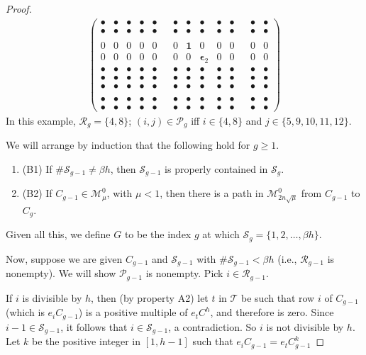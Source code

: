 \documentclass{amsart}
\theoremstyle{definition}
\theoremstyle{remark}
\newcommand{\bu}{\bullet}
\numberwithin{equation}{section}
\begin{document}
{{\begin{proof}
\begin{align*}
\begin{pmatrix}
\bu &\bu &\bu &\bu &\bu   && \bu &\bu &\bu &\bu &\bu && \bu &\bu  \\ 
\bu &\bu &\bu &\bu &\bu && \bu &\bu &\bu &\bu &\bu && \bu &\bu  \\ 
 & & & & & & & & & & &  & & \\
0&0&0&0&0&  & 0&\mathbf 1 &0&0&0            & &0&0 \\
0&0&0&0&0&  & 0&0&\boldsymbol\epsilon_2   &0&0& &0&0 \\ 
\bu &\bu &\bu &\bu &\bu &  & \bu &\bu &\bu &\bu   &\bu & &\bu &\bu  \\ 
\bu &\bu &\bu &\bu &\bu &  & \bu &\bu &\bu &\bu &\bu   & &\bu &\bu  \\ 
\bu &\bu &\bu &\bu &\bu &  & \bu &\bu &\bu &\bu &\bu                      & &\bu &\bu  \\ 
 & & & & & & & & & & &  & & \\
\bu &\bu &\bu &\bu &\bu && \bu &\bu &\bu &\bu &\bu && \bu &\bu  \\ 
\bu &\bu &\bu &\bu &\bu && \bu &\bu &\bu &\bu &\bu && \bu &\bu  
\end{pmatrix} 
\end{align*} 
In this example, 
$\mathcal R_{g}=\{4,8\}$; 
$(i,j)\in \mathcal P_{g}$ iff 
$i\in \{4,8\}$ and 
$j\in \{5,9,10,11,12\}$.

We will arrange by induction that the 
following hold for $g\geq 1$.  
\begin{enumerate} 
\item[] (B1) 
If $\# \mathcal S_{g-1}\neq \beta h$, then $\mathcal S_{g-1}$
is properly contained in  $\mathcal S_{g}$. 
\item[] (B2)  
If  $C_{g-1}\in \mathcal M^0_{\mu}$, 
with $\mu <1$, 
then there is a path 
 in $\mathcal M^0_{2n\sqrt{ \mu}}$
from $C_{g-1}$ to 
$C_{g}$.  
\end{enumerate} 
Given all this, we  define 
 $G$ to be the index $g$ at which $\mathcal S_g=
\{1,2,\dots , \beta h\}$.  

Now, suppose we are given $C_{g-1}$
 and $\mathcal S_{g-1}$ with 
$\#\mathcal S_{g-1} < \beta h$ 
(i.e.,  $\mathcal R_{g-1}$ is nonempty). 
We will show  $\mathcal P_{g-1}$ is 
nonempty. 
Pick $i\in \mathcal R_{g-1}$. 

If $i$ is divisible by $h$, then 
(by property A2) let $t$ in 
$\mathcal T$ be such that row $i$ of $C_{g-1}$ 
(which is $e_iC_{g-1}$) is a positive 
multiple of $e_tC^h$, and therefore is zero. 
Since $i-1\in \mathcal S_{g-1}$, it follows 
that $i\in \mathcal S_{g-1}$, a contradiction. 
So $i$ is not divisible by $h$. Let $k$ be 
the positive integer  in $[1,h-1]$ 
such that $e_iC_{g-1} = e_tC_{g-1}^k $ 


\end{proof}}}
\end{document}

